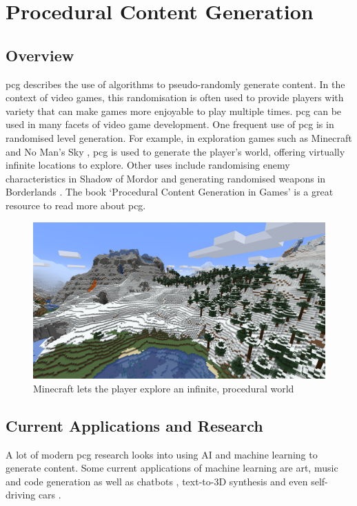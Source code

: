 \section{Procedural Content Generation}
\subsection{Overview}
\acrfull{pcg} describes the use of algorithms to pseudo-randomly generate content. In the context of video games, this randomisation is often used to provide players with variety that can make games more enjoyable to play multiple times. \acrlong{pcg} can be used in many facets of video game development. One frequent use of \acrshort{pcg} is in randomised level generation. For example, in exploration games such as Minecraft \cite{minecraft} and No Man's Sky \cite{nomanssky}, \acrshort{pcg} is used to generate the player's world, offering virtually infinite locations to explore. Other uses include randomising enemy characteristics in Shadow of Mordor \cite{shadowofmordor} and generating randomised weapons in Borderlands \cite{borderlands}. The book `Procedural Content Generation in Games' \cite{pcgbook} is a great resource to read more about \acrshort{pcg}.

\begin{figure}[H]
    \centering
    \includegraphics[width=\textwidth, height=0.3\textheight, keepaspectratio]{Images/Minecraft.jpg}
    \caption{Minecraft lets the player explore an infinite, procedural world \cite{minecraft_screenshot}}
    \label{fig:minecraftScreenshot}
\end{figure}

\subsection{Current Applications and Research}
A lot of modern \acrshort{pcg} research looks into using AI and machine learning to generate content. Some current applications of machine learning are art, music and code generation as well as chatbots \cite{AIGC_Survey}, text-to-3D synthesis \cite{Magic3D} and even self-driving cars \cite{Self_Driving_Cars}.

